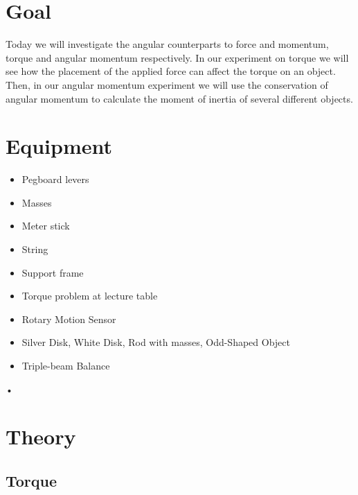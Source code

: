 \documentclass[main.tex]{subfiles}
\begin{document}
\section*{Goal}
Today we will investigate the angular counterparts to force and momentum, torque and angular momentum respectively. In our experiment on torque we will see how the placement of the applied force can affect the torque on an object. Then, in our angular momentum experiment we will use the conservation of angular momentum to calculate the moment of inertia of several different objects.

\section*{Equipment}
\begin{itemize}
\item
Pegboard levers
\item
Masses
\item
Meter stick
\item
String
\item
Support frame
\item
Torque problem at lecture table
\item
Rotary Motion Sensor
\item
Silver Disk, White Disk, Rod with masses, Odd-Shaped Object
\item
Triple-beam Balance
\end{itemize}•

\section*{Theory}
\subsection*{Torque}

\begin{figure}
\centering
{}
\caption{} \label{fig:Torque}
\end{figure} \vspace{-10pt}
\end{document}
